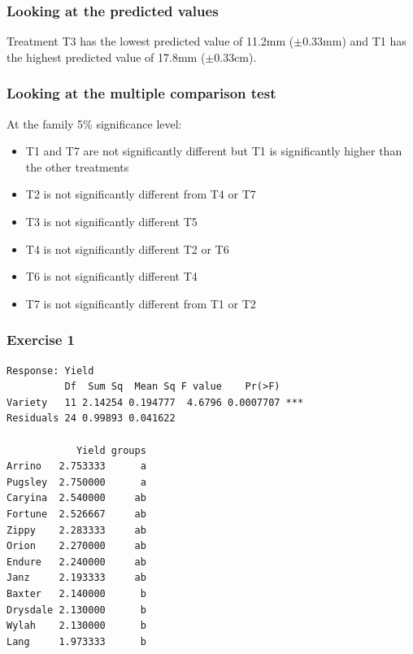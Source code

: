 
\begin{frame}\frametitle{Looking at the predicted values}
Treatment T3 has the lowest predicted value of 11.2mm ($\pm$0.33mm)
and T1 has the highest predicted value of 17.8mm
($\pm$0.33cm).
\end{frame}


\begin{frame}\frametitle{Looking at the multiple comparison test}
At the family 5\% significance level:
\begin{itemize}
\item T1 and T7 are not significantly different but T1 is significantly higher than
the other treatments
\item T2 is not significantly different from T4 or T7
\item T3 is not significantly different T5
\item T4 is not significantly different T2 or T6
\item T6 is not significantly different T4
\item T7 is not significantly different from T1 or T2
\end{itemize}
\end{frame}



\begin{frame}[fragile]\frametitle{Exercise 1}
\begin{verbatim}
Response: Yield
          Df  Sum Sq  Mean Sq F value    Pr(>F)
Variety   11 2.14254 0.194777  4.6796 0.0007707 ***
Residuals 24 0.99893 0.041622

            Yield groups
Arrino   2.753333      a
Pugsley  2.750000      a
Caryina  2.540000     ab
Fortune  2.526667     ab
Zippy    2.283333     ab
Orion    2.270000     ab
Endure   2.240000     ab
Janz     2.193333     ab
Baxter   2.140000      b
Drysdale 2.130000      b
Wylah    2.130000      b
Lang     1.973333      b
\end{verbatim}
\end{frame}




